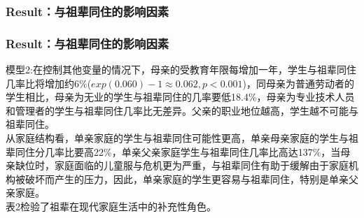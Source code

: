 \documentclass{beamer}
\begin{document}
\begin{frame}
\frametitle{Result：与祖辈同住的影响因素}
\end{frame}

\begin{frame}
\frametitle{Result：与祖辈同住的影响因素}
	模型2:在控制其他变量的情况下，母亲的受教育年限每增加一年，学生与祖辈同住几率比将增加约6\%($exp(0.060)-1 \approx 0.062,p<0.001$)，同母亲为普通劳动者的学生相比，母亲为无业的学生与祖辈同住的几率要低18.4\%，母亲为专业技术人员和管理者的学生与祖辈同住几率比无差异。父亲的职业地位越高，学生越不可能与祖辈同住。
\\ 从家庭结构看，单亲家庭的学生与祖辈同住可能性更高，单亲母亲家庭的学生与祖辈同住分几率比要高22\%，单亲父亲家庭学生与祖辈同住几率比高达137\%，当母亲缺位时，家庭面临的儿童服与危机更为严重，与祖辈同住有助于缓解由于家庭机构被破坏而产生的压力，因此，单亲家庭的学生更容易与祖辈同住，特别是单亲父亲家庭。
\\ 表2检验了祖辈在现代家庭生活中的补充性角色。
\end{frame}
\end{document}
